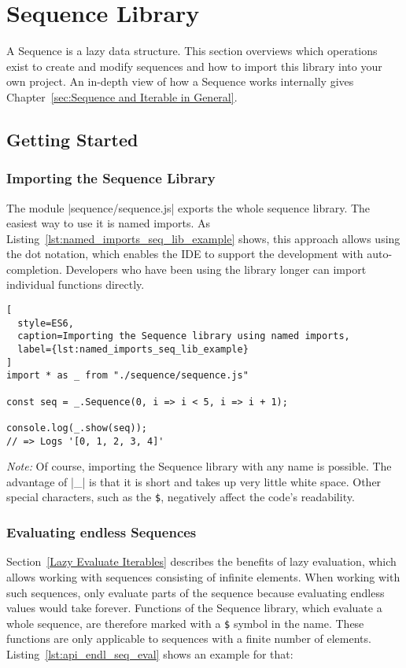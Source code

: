 \section{Sequence Library} %
A Sequence is a lazy data structure. This section overviews which operations
exist to create and modify sequences and how to import this library into your
own project. An in-depth view of how a Sequence works
internally gives Chapter~\ref{sec:Sequence and Iterable in General}.

\subsection{Getting Started} %
\label{sub:Getting Started}
\subsubsection{Importing the Sequence Library} %
\label{sec:Importing the Sequence Library}

The module |sequence/sequence.js| exports the whole sequence library. The
easiest way to use it is named imports. As
Listing~\ref{lst:named_imports_seq_lib_example} shows, this approach allows
using the dot notation, which enables the IDE to support the development with
auto-completion. Developers who have been using the library longer can import
individual functions directly.
\begin{lstlisting}[
  style=ES6,
  caption=Importing the Sequence library using named imports,
  label={lst:named_imports_seq_lib_example}
]
import * as _ from "./sequence/sequence.js"

const seq = _.Sequence(0, i => i < 5, i => i + 1);

console.log(_.show(seq));
// => Logs '[0, 1, 2, 3, 4]'
\end{lstlisting}
\textit{Note:} Of course, importing the Sequence library with any name is
possible. The advantage of |_| is that it is short and takes up very little
white space. Other special characters, such as the \lstinline{$}, negatively
affect the code's readability. 

\subsubsection{Evaluating endless Sequences} %
\label{sec:Evaluating endless Sequences}
Section~\ref{Lazy Evaluate Iterables} describes the benefits of lazy
evaluation, which allows working with sequences consisting of infinite
elements. When working with such sequences, only evaluate parts of the sequence
because evaluating endless values would take forever. Functions of the Sequence
library, which evaluate a whole sequence, are therefore marked with a
\lstinline{$} symbol in the name. These functions are only applicable to
sequences with a finite number of elements. \\
Listing~\ref{lst:api_endl_seq_eval} shows an example for that:

